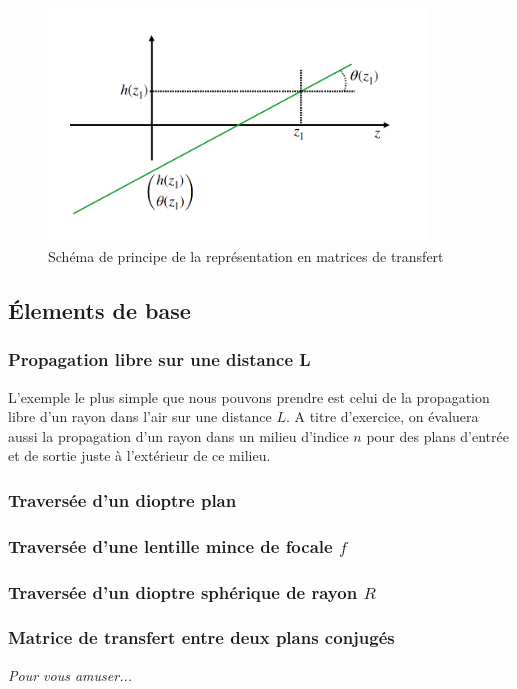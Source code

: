 \documentclass[a4paper]{book}
\begin{document}
\begin{figure}[!htbp]
\begin{center}
\includegraphics[width=10cm]{pictures/ABCD.png}
\end{center}
\caption{Schéma de principe de la représentation en matrices de transfert}
\label{fig:matrix}
\end{figure}


\subsection{\'Elements de base}\label{subsec:el_base}

\subsubsection{Propagation libre sur une distance L}
L'exemple le plus simple que nous pouvons prendre est celui de la propagation libre d'un rayon dans l'air sur une distance $L$. A titre d'exercice, on évaluera aussi la propagation d'un rayon dans un milieu d'indice $n$ pour des plans d'entrée et de sortie juste à l'extérieur de ce milieu.
\subsubsection{Traversée d'un dioptre plan}
\subsubsection{Traversée d'une lentille mince de focale $f$}
\subsubsection{Traversée d'un dioptre sphérique de rayon $R$}
\subsubsection{Matrice de transfert entre deux plans conjugés}
\textit{Pour vous amuser...}
\end{document}
